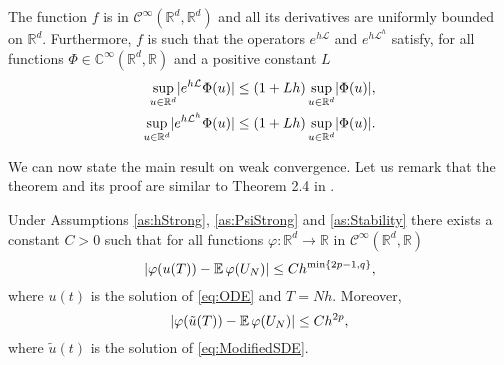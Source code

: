 \documentclass{siamart1116}
\numberwithin{theorem}{section}
\DeclarePairedDelimiter{\abs}{\lvert}{\rvert}
\renewcommand{\phi}{\varphi}
\newcommand{\R}{\mathbb{R}}
\newcommand{\C}{\mathbb{C}}
\newcommand{\diffL}{\mathcal{L}}
\newcommand{\E}{\operatorname{\mathbb{E}}}
\begin{document}
\begin{assumption}\label{as:Stability} The function $f$ is in $\mathcal{C}^\infty(\R^d, \R^d)$ and all its derivatives are uniformly bounded on $\R^d$. Furthermore, $f$ is such that the operators $e^{h\diffL}$ and $e^{h\diffL^h}$ satisfy, for all functions $\Phi\in\C^{\infty}(\R^d, \R)$ and a positive constant $L$
	\begin{equation}
	\begin{aligned}
		\sup_{u\in\R^d} \abs{e^{h\diffL}\Phi(u)} &\leq (1 + Lh)\sup_{u\in\R^d}\abs{\Phi(u)},\\
		\sup_{u\in\R^d} \abs{e^{h\diffL^h}\Phi(u)} &\leq (1 + Lh)\sup_{u\in\R^d}\abs{\Phi(u)}.
	\end{aligned}
	\end{equation}
\end{assumption}

We can now state the main result on weak convergence. Let us remark that the theorem and its proof are similar to Theorem 2.4 in \cite{CGS16}.

\begin{theorem}\label{thm:weakOrder} Under Assumptions \ref{as:hStrong}, \ref{as:PsiStrong} and \ref{as:Stability} there exists a constant $C > 0$ such that for all functions $\phi\colon\R^d\to\R$ in $\mathcal{C}^\infty(\R^d,\R)$
	\begin{equation}
		\abs{\phi(u(T)) - \E\phi(U_N)} \leq Ch^{\min\{2p - 1, q\}},
	\end{equation}
	where $u(t)$ is the solution of \eqref{eq:ODE} and $T = Nh$. Moreover, 
	\begin{equation}
		\abs{\phi(\tilde u(T)) - \E\phi(U_N)} \leq Ch^{2p},		
	\end{equation}
	where $\tilde u(t)$ is the solution of \eqref{eq:ModifiedSDE}.
\end{theorem}
\end{document}
